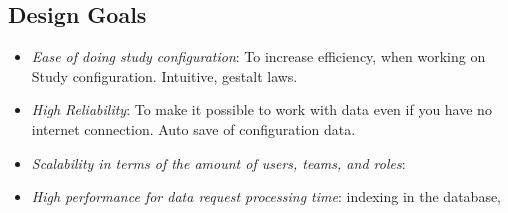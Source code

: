 \subsection{Design Goals}
\begin{itemize}
\item \textit{Ease of doing study configuration}: To increase efficiency, when working on Study configuration. Intuitive, gestalt laws.
\item \textit{High Reliability}: To make it possible to work with data even if you have no internet connection. Auto save of configuration data.
\item \textit{Scalability in terms of the amount of users, teams, and roles}:
\item \textit{High performance for data request processing time}: indexing in the database, 
\end{itemize}